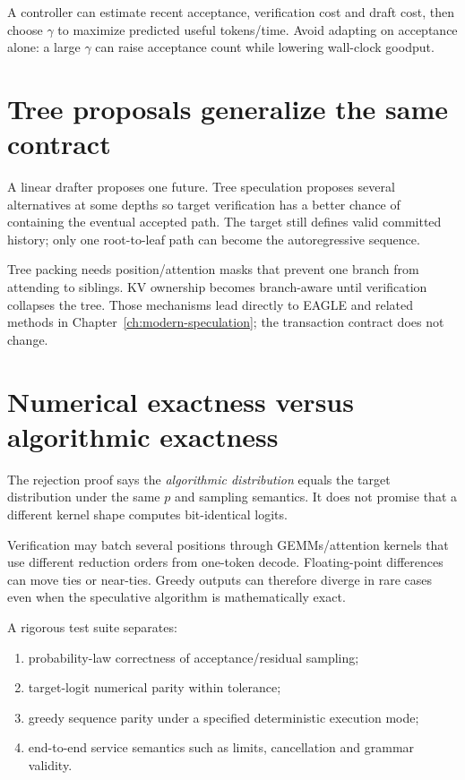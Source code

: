 A controller can estimate recent acceptance, verification cost and draft cost, then
choose $\gamma$ to maximize predicted useful tokens/time. Avoid adapting on acceptance
alone: a large $\gamma$ can raise acceptance count while lowering wall-clock goodput.

\section{Tree proposals generalize the same contract}

A linear drafter proposes one future. Tree speculation proposes several alternatives
at some depths so target verification has a better chance of containing the eventual
accepted path. The target still defines valid committed history; only one root-to-leaf
path can become the autoregressive sequence.

Tree packing needs position/attention masks that prevent one branch from attending to
siblings. KV ownership becomes branch-aware until verification collapses the tree.
Those mechanisms lead directly to EAGLE and related methods in
Chapter~\ref{ch:modern-speculation}; the transaction contract does not change.

\section{Numerical exactness versus algorithmic exactness}

The rejection proof says the \emph{algorithmic distribution} equals the target
distribution under the same $p$ and sampling semantics. It does not promise that a
different kernel shape computes bit-identical logits.

Verification may batch several positions through GEMMs/attention kernels that use
different reduction orders from one-token decode. Floating-point differences can move
ties or near-ties. Greedy outputs can therefore diverge in rare cases even when the
speculative algorithm is mathematically exact.

A rigorous test suite separates:
\begin{enumerate}
\item probability-law correctness of acceptance/residual sampling;
\item target-logit numerical parity within tolerance;
\item greedy sequence parity under a specified deterministic execution mode;
\item end-to-end service semantics such as limits, cancellation and grammar validity.
\end{enumerate}

